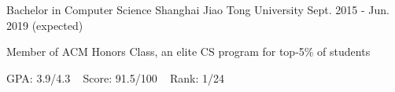 

\begin{cventries}

  \cventry
    {Bachelor in Computer Science} %
    {Shanghai Jiao Tong University} %
    {Sept. 2015 - Jun. 2019 (expected)} %
    {} %
    {
    \begin{cvitems} %
    	\item {Member of ACM Honors Class, an elite CS program for top-5\% of students}
    	\item {GPA: 3.9/4.3 ~ Score: 91.5/100 ~ Rank: 1/24}
    \end{cvitems}
    }

\end{cventries}
